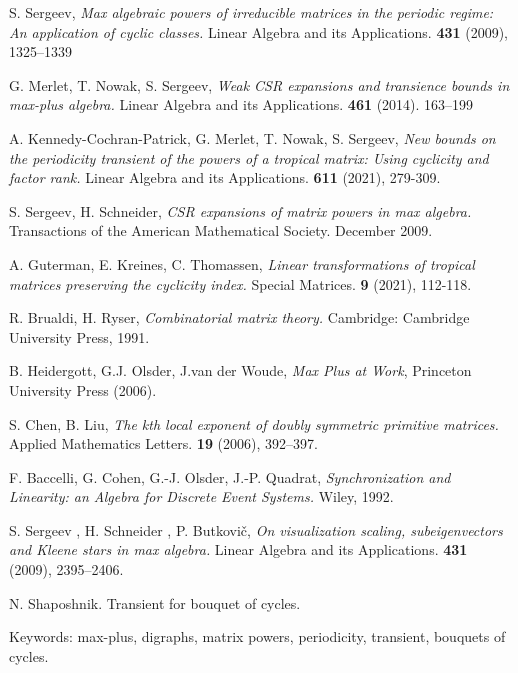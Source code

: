 \documentclass[12pt]{article}
\theoremstyle{definition}
\begin{document}
\begin{thebibliography}{9}

S. Sergeev, \textit{Max algebraic powers of irreducible matrices in the periodic regime: An application of cyclic classes.} Linear Algebra and its Applications. \textbf{431} (2009), 1325–1339

G. Merlet, T. Nowak, S. Sergeev, \textit{Weak CSR expansions and transience bounds in max-plus algebra.}
Linear Algebra and its Applications. \textbf{461} (2014). 163–199

A. Kennedy-Cochran-Patrick, G. Merlet, T. Nowak, S. Sergeev,
\textit{New bounds on the periodicity transient of the powers of a tropical matrix: Using cyclicity and factor rank.}
Linear Algebra and its Applications. \textbf{611} (2021), 279-309.

S. Sergeev, H. Schneider,
\textit{CSR expansions of matrix powers in max algebra.} Transactions of the American Mathematical Society. December 2009.

A. Guterman, E. Kreines, C. Thomassen,
\textit{Linear transformations of tropical matrices
preserving the cyclicity index.}
Special Matrices. \textbf{9} (2021), 112-118.

R. Brualdi, H. Ryser, \textit{Combinatorial matrix theory.} Cambridge: Cambridge University Press, 1991.

B. Heidergott, G.J. Olsder, J.van der Woude, \textit{Max Plus at Work}, Princeton University Press (2006).

S. Chen, B. Liu, \textit{The kth local exponent of doubly symmetric primitive matrices.} Applied Mathematics Letters. \textbf{19} (2006), 392–397.

F. Baccelli, G. Cohen, G.-J. Olsder, J.-P. Quadrat, \textit{Synchronization and Linearity: an Algebra for Discrete Event Systems.} Wiley, 1992.

S. Sergeev , H. Schneider , P. Butkovič, \textit{On visualization scaling, subeigenvectors and Kleene stars in max algebra.}
Linear Algebra and its Applications. \textbf{431} (2009), 2395–2406.

\end{thebibliography}

N. Shaposhnik. Transient for bouquet of cycles.

Keywords: max-plus, digraphs, matrix powers, periodicity, transient, bouquets of cycles.
\end{document}
